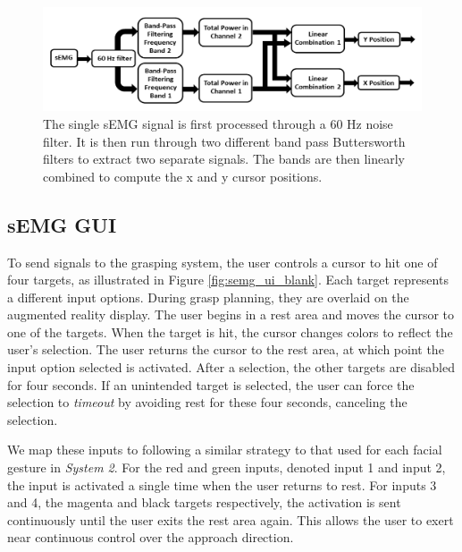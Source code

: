 \begin{figure}
\centering
\includegraphics[width=.99\columnwidth]{semg_processing_pipeline.png}
\caption{The single sEMG signal is first processed through a 60 Hz noise filter. It is then run through two different band pass Buttersworth filters to extract two separate signals. The bands are then linearly combined to compute the x and y cursor positions.}
\label{fig:semg_processing_pipeline}
\end{figure}

\subsection{sEMG GUI}
To send signals to the grasping system, the user controls a cursor to hit one of four targets, as illustrated in Figure \ref{fig:semg_ui_blank}. Each target represents a different input options. During grasp planning, they are overlaid on the augmented reality display. The user begins in a rest area and moves the cursor to one of the targets. When the target is hit, the cursor changes colors to reflect the user's selection. The user returns the cursor to the rest area, at which point the input option selected is activated. After a selection, the other targets are disabled for four seconds. If an unintended target is selected, the user can force the selection to \emph{timeout} by avoiding rest for these four seconds, canceling the selection. 

We map these inputs to following a similar strategy to that used for each facial gesture in \emph{System 2}. For the red and green inputs, denoted input 1 and input 2, the input is activated a single time when the user returns to rest. For inputs 3 and 4, the magenta and black targets respectively, the activation is sent continuously until the user exits the rest area again. This allows the user to exert near continuous control over the approach direction. 

